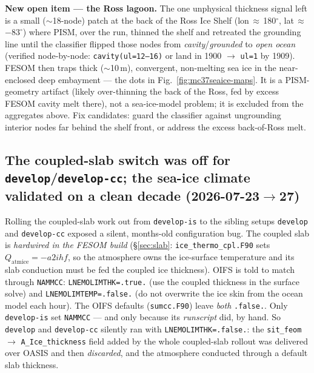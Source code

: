 \documentclass[11pt,a4paper]{article}
\newcommand{\code}[1]{\texttt{\small #1}}
\begin{document}
\textbf{New open item --- the Ross lagoon.} The one unphysical thickness signal left is a small
($\sim$18-node) patch at the back of the Ross Ice Shelf (lon\,$\approx$\,180$^\circ$,
lat\,$\approx$\,$-83^\circ$) where PISM, over the run, thinned the shelf and retreated the grounding
line until the classifier flipped those nodes from \emph{cavity}/\emph{grounded} to \emph{open ocean}
(verified node-by-node: \code{cavity(ul=12--16)} or land in 1900 $\to$ \code{ul=1} by 1909). FESOM then
traps thick ($\sim$10\,m), convergent, non-melting sea ice in the near-enclosed deep embayment --- the
dots in Fig.~\ref{fig:mc37seaice-maps}. It is a PISM-geometry artifact (likely over-thinning the back
of the Ross, fed by excess FESOM cavity melt there), not a sea-ice-model problem; it is excluded from
the aggregates above. Fix candidates: guard the classifier against ungrounding interior nodes far
behind the shelf front, or address the excess back-of-Ross melt.

\subsection{The coupled-slab switch was off for \code{develop}/\code{develop-cc}; the sea-ice climate validated on a clean decade (2026-07-23$\to$27)}\label{sec:nammcc}

Rolling the coupled-slab work out from \code{develop-is} to the sibling setups \code{develop} and
\code{develop-cc} exposed a silent, months-old configuration bug. The coupled slab is
\emph{hardwired in the FESOM build} (\S\ref{sec:slab}: \code{ice\_thermo\_cpl.F90} sets
$Q_\mathrm{atmice}=-a2ihf$, so the atmosphere owns the ice-surface temperature and its slab
conduction must be fed the coupled ice thickness). OIFS is told to match through
\code{NAMMCC}: \code{LNEMOLIMTHK=.true.} (use the coupled thickness in the surface solve) and
\code{LNEMOLIMTEMP=.false.} (do not overwrite the ice skin from the ocean model each hour). The
OIFS defaults (\code{sumcc.F90}) leave \emph{both} \code{.false.}. Only \code{develop-is} set
\code{NAMMCC} --- and only because its \emph{runscript} did, by hand. So \code{develop} and
\code{develop-cc} silently ran with \code{LNEMOLIMTHK=.false.}: the \code{sit\_feom}$\to$%
\code{A\_Ice\_thickness} field added by the whole coupled-slab rollout was delivered over OASIS
and then \emph{discarded}, and the atmosphere conducted through a default slab thickness.
\end{document}
